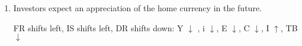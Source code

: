\documentclass[11pt,dvipsnames]{article} %
\newif \ifAnswers
\begin{document}
\begin{enumerate}
\begin{enumerate}
{\begin{framed}
\begin{tikzpicture}[x=0.75pt,y=0.75pt,yscale=-1,xscale=1]
							\end{tikzpicture}
										
					\end{framed}%
				}
				
				\fi
				
				\item Investors expect an appreciation of the home currency in the future.
				
				\ifAnswers
				
				{\color{Blue}
					\begin{framed}
						FR shifts left, IS shifts left, DR shifts down: Y $\downarrow$ , i $\downarrow$, E $\downarrow$, C $\downarrow$, I $\uparrow$, TB $\downarrow$ \\
						
							
							
							
							\begin{tikzpicture}[x=0.75pt,y=0.75pt,yscale=-1,xscale=1]
								

\end{tikzpicture}
\end{framed}}
\end{enumerate}
\end{enumerate}
\end{document}
